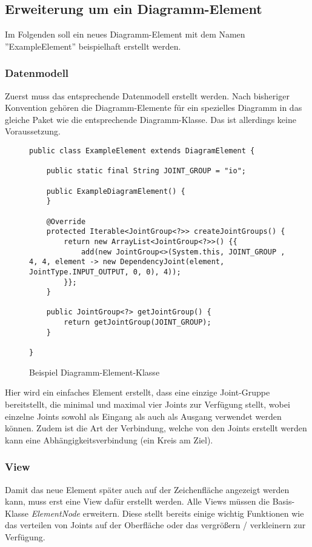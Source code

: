 \pagebreak
\subsection{Erweiterung um ein Diagramm-Element}
\label{add_element}
Im Folgenden soll ein neues Diagramm-Element mit dem Namen ''ExampleElement'' beispielhaft erstellt werden.

\subsubsection{Datenmodell}
Zuerst muss das entsprechende Datenmodell erstellt werden. Nach bisheriger Konvention gehören die Diagramm-Elemente
für ein spezielles Diagramm in das gleiche Paket wie die entsprechende Diagramm-Klasse. Das ist allerdings keine
Voraussetzung.

\begin{figure}[H]
	\centering
	\begin{lstlisting}
public class ExampleElement extends DiagramElement {

    public static final String JOINT_GROUP = "io";

    public ExampleDiagramElement() {
    }

    @Override
    protected Iterable<JointGroup<?>> createJointGroups() {
        return new ArrayList<JointGroup<?>>() {{
            add(new JointGroup<>(System.this, JOINT_GROUP , 4, 4, element -> new DependencyJoint(element, JointType.INPUT_OUTPUT, 0, 0), 4));
        }};
    }

    public JointGroup<?> getJointGroup() {
        return getJointGroup(JOINT_GROUP);
    }

}
	\end{lstlisting}
	\caption{Beispiel Diagramm-Element-Klasse}
\end{figure}
Hier wird ein einfaches Element erstellt, dass eine einzige Joint-Gruppe bereitstellt, die minimal und maximal
vier Joints zur Verfügung stellt, wobei einzelne Joints sowohl als Eingang als auch als Ausgang verwendet werden
können. Zudem ist die Art der Verbindung, welche von den Joints erstellt werden kann eine Abhängigkeitsverbindung
(ein Kreis am Ziel).
\subsubsection{View}
Damit das neue Element später auch auf der Zeichenfläche angezeigt werden kann, muss erst eine View dafür erstellt
werden. Alle Views müssen die Basis-Klasse \textit{ElementNode} erweitern. Diese stellt bereits einige wichtig
Funktionen wie das verteilen von Joints auf der Oberfläche oder das vergrößern / verkleinern zur Verfügung.

